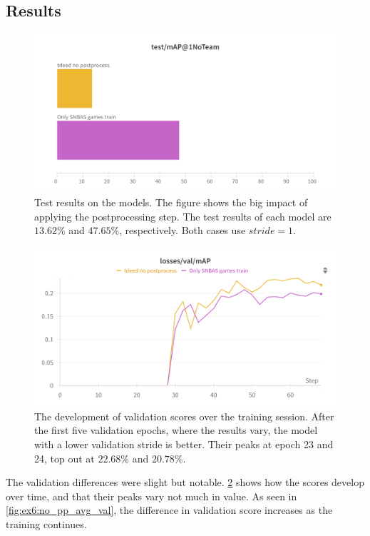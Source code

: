 \subsection{Results}
\label{ssec:ex6_results}

\begin{figure}
    \centering
    \includegraphics[width=0.75\linewidth]{figures/no_pprocess_test.png}
    \caption{Test results on the models. The figure shows the big impact of applying the postprocessing step. The test results of each model are $13.62\%$ and $47.65\%$, respectively. Both cases use $stride=1$.}
    \label{fig:ex6:no_pp_test}
\end{figure}

\begin{figure}
    \centering
    \includegraphics[width=0.75\linewidth]{figures/no_pprocess_val.png}
    \caption{The development of validation scores over the training session. After the first five validation epochs, where the results vary, the model with a lower validation stride is better. Their peaks at epoch 23 and 24, top out at $22.68\%$ and $20.78\%$. }
        \label{fig:ex6:no_pp_val}
\end{figure}

The validation differences were slight but notable. \cref{fig:ex6:no_pp_val} shows how the scores develop over time, and that their peaks vary not much in value. As seen in \cref{fig:ex6:no_pp_avg_val}, the difference in validation score increases as the training continues. 

